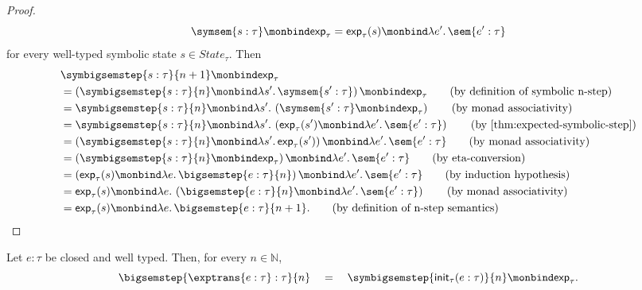\begin{proof}
  \begin{equation}
    \symsem{s : \tau}
    \monbind
    \mathsf{exp}_\tau
    =
    \mathsf{exp}_\tau(s)
    \monbind
    \lambda e'.\,\sem{e' : \tau}
  \end{equation}
  for every well-typed symbolic state $s \in State_\tau$. Then
  \begin{align}
    &\symbigsemstep{s : \tau}{n+1}
    \monbind
    \mathsf{exp}_\tau
    \notag \\
    &=
    \left(
      \symbigsemstep{s : \tau}{n}
      \monbind
      \lambda s'.\,\symsem{s' : \tau}
    \right)
    \monbind
    \mathsf{exp}_\tau
    \tag{\text{by definition of symbolic n-step}} \\
    &=
    \symbigsemstep{s : \tau}{n}
    \monbind
    \lambda s'.\,
      \left(
        \symsem{s' : \tau}
        \monbind
        \mathsf{exp}_\tau
      \right)
    \tag{\text{by monad associativity}} \\
    &=
    \symbigsemstep{s : \tau}{n}
    \monbind
    \lambda s'.\,
      \left(
        \mathsf{exp}_\tau(s')
        \monbind
        \lambda e'.\,\sem{e' : \tau}
      \right)
    \tag{\text{by \Cref{thm:expected-symbolic-step}}} \\
    &=
    \left(
      \symbigsemstep{s : \tau}{n}
      \monbind
      \lambda s'.\,\mathsf{exp}_\tau(s')
    \right)
    \monbind
    \lambda e'.\,\sem{e' : \tau}
    \tag{\text{by monad associativity}} \\
    &=
    \left(
      \symbigsemstep{s : \tau}{n}
      \monbind
      \mathsf{exp}_\tau
    \right)
    \monbind
    \lambda e'.\,\sem{e' : \tau}
    \tag{\text{by eta-conversion}} \\
    &=
    \left(
      \mathsf{exp}_\tau(s)
      \monbind
      \lambda e.\,\bigsemstep{e : \tau}{n}
    \right)
    \monbind
    \lambda e'.\,\sem{e' : \tau}
    \tag{\text{by induction hypothesis}} \\
    &=
    \mathsf{exp}_\tau(s)
    \monbind
    \lambda e.\,
      \left(
        \bigsemstep{e : \tau}{n}
        \monbind
        \lambda e'.\,\sem{e' : \tau}
      \right)
    \tag{\text{by monad associativity}} \\
    &=
    \mathsf{exp}_\tau(s)
    \monbind
    \lambda e.\,\bigsemstep{e : \tau}{n+1}.
    \tag{\text{by definition of n-step semantics}}
  \end{align}
\end{proof}


\begin{theorem}
  Let $e:\tau$ be closed and well typed. Then, for every
  $n\in\mathbb N$,
  \[
    \bigsemstep{\exptrans{e:\tau} : \tau}{n}
    \quad 
    = 
    \quad
    \symbigsemstep{\mathsf{init}_\tau(e:\tau)}{n}
    \monbind
    \mathsf{exp}_\tau.
  \]
\end{theorem}

